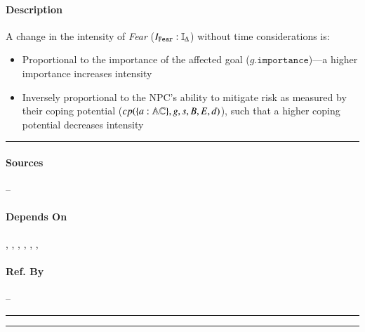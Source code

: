 \paragraph{Description} A change in the intensity of \textit{Fear} ($I_{\mathtt{Fear}}
: \mathbb{I}_{\Delta}$) without time considerations is:
\begin{itemize}
    \item Proportional to the importance of the affected goal
    ($g.\mathtt{importance}$)---a higher importance increases intensity

    \item Inversely proportional to the NPC's ability to mitigate risk as
    measured by their coping potential ($cp(\{a : \mathbb{AC}\}, g, s, B, E,
    d)$), such that a higher coping potential decreases intensity
\end{itemize}
\hrule

\paragraph{Sources} --

\paragraph{Depends On} , , 
, , , 
, 

\paragraph{Ref. By} -- \\\hrule\vspace{0.5mm}\hrule

~\newline

